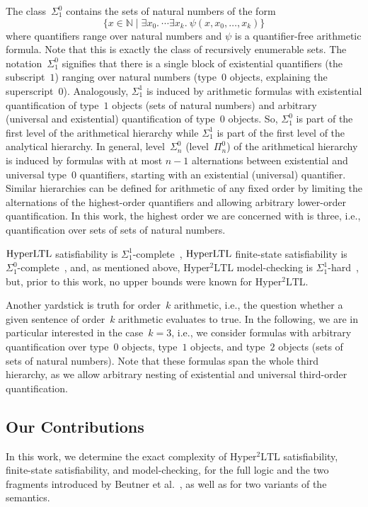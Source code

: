 \documentclass[dvipsnames,10pt,a4paper]{amsart}
\theoremstyle{definition}
\theoremstyle{remark}
\newcommand{\nats}{\mathbb{N}}
\newcommand{\set}[1]{\{#1\}}
\newcommand{\hyltl}{\mathrm{Hyper\-LTL}\xspace}
\newcommand{\sohyltl}{\mathrm{Hyper^2LTL}\xspace}
\begin{document}
The class~$\Sigma_1^0$ contains the sets of natural numbers of the form
\[
\set{x \in \nats \mid \exists x_0.\  \cdots \exists x_k.\ \psi(x, x_0, \ldots, x_k)}
\] 
where quantifiers range over natural numbers and $\psi$ is a quantifier-free arithmetic formula. 
Note that this is exactly the class of recursively enumerable sets.
The notation~$\Sigma_1^0$ signifies that there is a single block of existential quantifiers (the subscript~$1$) ranging over natural numbers (type~$0$ objects, explaining the superscript~$0$).
Analogously, $\Sigma_1^1$ is induced by arithmetic formulas with existential quantification of type~$1$ objects (sets of natural numbers) and arbitrary (universal and existential) quantification of type~$0$ objects.
So, $\Sigma_1^0$ is part of the first level of the arithmetical hierarchy while $\Sigma_1^1$ is part of the first level of the analytical hierarchy.
In general, level~$\Sigma_n^0$ (level~$\Pi_n^0$) of the arithmetical hierarchy is induced by formulas with at most $n-1$ alternations between existential and universal type~$0$ quantifiers, starting with an existential (universal) quantifier. 
Similar hierarchies can be defined for arithmetic of any fixed order by limiting the alternations of the highest-order quantifiers and allowing arbitrary lower-order quantification.
In this work, the highest order we are concerned with is three, i.e., quantification over sets of sets of natural numbers.

$\hyltl$ satisfiability is $\Sigma_1^1$-complete~\cite{hyperltlsatconf}, $\hyltl$ finite-state satisfiability is $\Sigma_1^0$-complete~\cite{FinkbeinerH16,hyperltlsat}, and, as mentioned above, $\sohyltl$ model-checking is $\Sigma_1^1$-hard~\cite{DBLP:conf/cav/BeutnerFFM23}, but, prior to this work, no upper bounds were known for $\sohyltl$.


Another yardstick is truth for order~$k$ arithmetic, i.e., the question whether a given sentence of order~$k$ arithmetic evaluates to true. In the following, we are in particular interested in the case~$k=3$, i.e., we consider formulas with arbitrary quantification over type~$0$ objects, type~$1$ objects, and type~$2$ objects (sets of sets of natural numbers). 
Note that these formulas span the whole third hierarchy, as we allow arbitrary nesting of existential and universal third-order quantification.

\subsection{Our Contributions}
In this work, we determine the exact complexity of $\sohyltl$ satisfiability, finite-state satisfiability, and model-checking, for the full logic and the two fragments introduced by Beutner et al.~\cite{DBLP:conf/cav/BeutnerFFM23}, as well as for two variants of the semantics.
\end{document}

